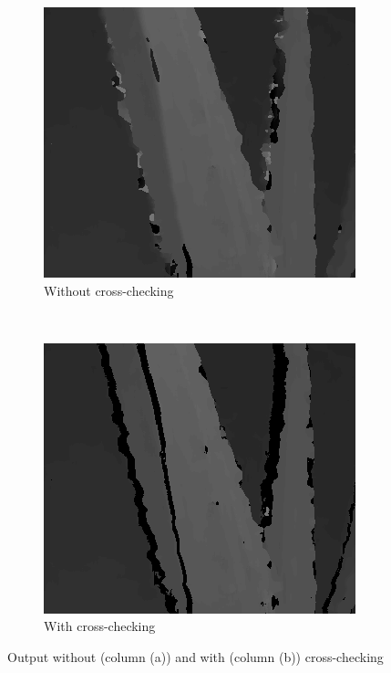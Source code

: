\begin{figure}
  \begin{subfigure}[b]{0.48\textwidth}
    \centering
    \includegraphics[width=\textwidth]{images/normal-zoomed.png}
    \caption{Without cross-checking}
  \end{subfigure}
  ~
  \begin{subfigure}[b]{0.48\textwidth}
    \centering
    \includegraphics[width=\textwidth]{images/no-fill-zoomed.png}
    \caption{With cross-checking}
  \end{subfigure}

  \caption{Output without (column (a)) and with (column (b))
    cross-checking}

\end{figure}




